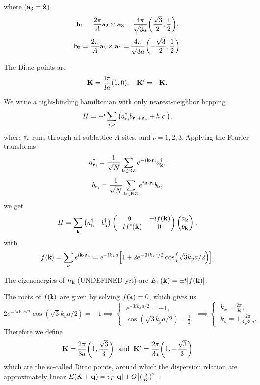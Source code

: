 \documentclass[a4paper,10pt]{article}
\begin{document}
where ($\vb{a}_3 = \vu{z}$)
$$
\vb{b}_1 = \frac{2\pi}{A} \vb{a}_2 \times \vb{a}_3 = \frac{4\pi}{\sqrt{3} a } \qty(\frac{\sqrt{3}}{2}, \frac{1}{2}),
$$
$$
\vb{b}_2 = \frac{2\pi}{A} \vb{a}_3 \times \vb{a}_1 = \frac{4\pi}{\sqrt{3} a } \qty(-\frac{\sqrt{3}}{2}, \frac{1}{2}).
$$

The Dirac points are
$$
\vb{K} = \frac{4\pi}{3a} (1, 0) , \quad \vb{K}' = -\vb{K}.
$$



We write a tight-binding hamiltonian with only nearest-neighbor hopping
$$
H = -t \sum_{i,\nu} \qty(a^\dagger_{\vb{r}_i} b_{\vb{r}_i + \bm{\delta}_\nu} + h.c. ),
$$
where $\vb{r}_i$ runs through all sublattice $A$ sites, and $\nu = 1, 2, 3$. Applying the Fourier transforms
$$
a_{\r_i}^\d = \frac{1}{\sqrt{N}} \sum_{\k \in \text{BZ}} e^{-i \k \vdot \r_i} a_{\k}^\d,
$$
$$
b_{\r_i} = \frac{1}{\sqrt{N}} \sum_{\k \in \text{BZ}} e^{i \k \vdot \r_i} b_{\k},
$$
we get
$$
H = \sum_{\vb{k}}
\begin{pmatrix}
a_{\vb{k}}^\dagger & b_{\vb{k}}^\dagger
\end{pmatrix}
\begin{pmatrix}
0 & -t f(\vb{k}) \\
-t f^*(\vb{k}) & 0
\end{pmatrix}
\begin{pmatrix}
a_{\vb{k}} \\ b_{\vb{k}}
\end{pmatrix},
$$
with
$$
f(\k) = \sum_{\nu} e^{i \k \vdot \bm{\delta}_\nu} =
e^{-i k_x a} \qty[ 1 + 2 e^{-3ik_x a / 2} \cos(\sqrt{3} k_y a / 2) ].
$$

The eigenenergies of $h_{\vb{k}}$ (UNDEFINED yet) are $E_\pm(\vb{k}) = \pm t \abs{f(\vb{k})}$.

The roots of $f(\vb{k})$ are given by solving $f(\vb{k}) = 0$, which gives us
$$
2 e^{-3ik_x a / 2} \cos(\sqrt{3} k_y a / 2) = -1 \implies
\begin{cases}
\; e^{-3i k_x a/2} = - 1, \\
\; \cos(\sqrt{3} k_y a / 2) = \frac{1}{2}.
\end{cases}
\implies
\begin{cases}
\; k_x = \frac{2\pi}{3a}, \\
\; k_y = \pm \frac{2\pi}{3 \sqrt{3} a},
\end{cases}
$$
Therefore we define
$$
\vb{K} = \frac{2\pi}{3a} \qty(1, \frac{\sqrt{3}}{3}) \; \text{ and } \;
\vb{K}' = \frac{2\pi}{3a} \qty(1, -\frac{\sqrt{3}}{3})
$$
which are the so-called Dirac points, around which the dispersion relation are approximately linear $E(\vb{K} + \vb{q}) = v_F \abs{\vb{q}} + O\qty[(\frac{q}{K})^2]$.

%


\end{document}
